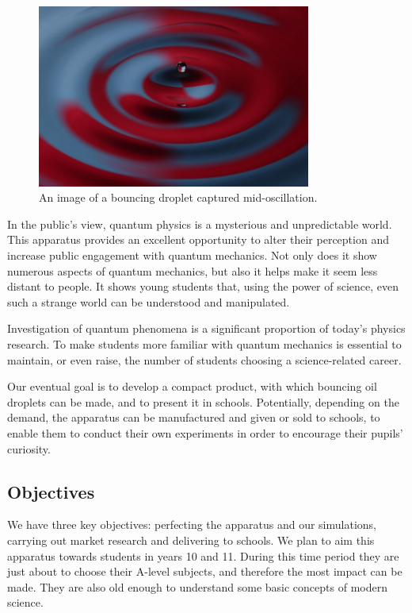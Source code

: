 \begin{center}
\begin{figure}[htb]
\centering
    \includegraphics[width=8.996cm,height=5.997cm]{education/STFCproposal/Droplet_STFC.jpg}
    \caption{An image of a bouncing droplet captured mid-oscillation.}
    \label{fig:droplet_STFC_report}
\end{figure} 
\end{center}

In the public's view, quantum physics is a mysterious and unpredictable world. This apparatus provides an excellent opportunity to alter their perception and increase public engagement with quantum mechanics. Not only does it show numerous aspects of quantum mechanics, but also it helps make it seem less distant to people. It shows young students that, using the power of science, even such a strange world can be understood and manipulated.

Investigation of quantum phenomena is a significant proportion of today's physics research. To make students more familiar with quantum mechanics is essential to maintain, or even raise, the number of students choosing a science-related career.

Our eventual goal is to develop a compact product, with which bouncing oil droplets can be made, and to present it in schools. Potentially, depending on the demand, the apparatus can be manufactured and given or sold to schools, to enable them to conduct their own experiments in order to encourage their pupils' curiosity. 

\subsection{Objectives}

We have three key objectives: perfecting the apparatus and our simulations, carrying out market research and delivering to schools. We plan to aim this apparatus towards students in years 10 and 11. During this time period they are just about to choose their A-level subjects, and therefore the most impact can be made. They are also old enough to understand some basic concepts of modern science.

